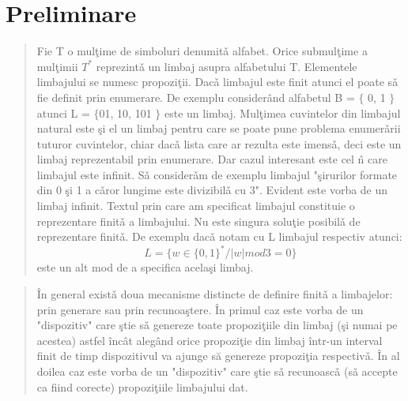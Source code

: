 \chapter{Preliminare}%
\label{Chapter2}
\begin{quotation}


 Fie T o mul\c time de simboluri denumit\v a alfabet. Orice submul\c time a mul\c timii $T^{*}$ reprezint\v a un limbaj asupra alfabetului T. Elementele limbajului se numesc propozi\c tii. Dac\v a limbajul este finit atunci el poate s\v a fie definit prin enumerare. De exemplu consider\^ and alfabetul B = $\lbrace$ 0, 1 $\rbrace$ atunci L = $\lbrace$01, 10, 101 $\rbrace$ este un limbaj. Mul\c timea cuvintelor din limbajul natural este \c si el un limbaj pentru care se poate pune problema enumer\v arii tuturor cuvintelor, chiar dac\v a lista care ar rezulta este imens\v a, deci este un limbaj reprezentabil prin enumerare. Dar cazul interesant este cel \^n care limbajul este infinit. S\v a consider\v am de
exemplu limbajul "\c sirurilor formate din 0 \c si 1 a c\v aror lungime este divizibil\v a cu 3". Evident este vorba de un limbaj infinit. Textul prin care am specificat limbajul constituie o reprezentare finit\v a a limbajului. Nu este singura solu\c tie posibil\v a de reprezentare finit\v a. De exemplu dac\v a notam cu L limbajul respectiv atunci:  
$$ L = \lbrace w \in \lbrace0,1 \rbrace^{*} \slash |w| mod 3 = 0 \rbrace$$
este un alt mod de a specifica acela\c si limbaj. 
\end{quotation}
\begin{quotation}
 \^ In general exist\v a doua mecanisme distincte de definire finit\v a a limbajelor: prin generare sau prin recunoa\c stere. \^In primul caz este vorba de un "dispozitiv" care \c stie s\v a genereze toate propozi\c tiile din limbaj (\c si numai pe acestea) astfel \^inc\^ at aleg\^ and orice propozi\c tie din limbaj \^ intr-un interval finit de timp dispozitivul va ajunge să genereze propozi\c tia respectiv\v a. \^ In al doilea caz este vorba de un "dispozitiv" care \c stie s\v a recunoasc\v a (s\v a accepte ca fiind corecte) propozi\c tiile limbajului dat. 
\end{quotation}

